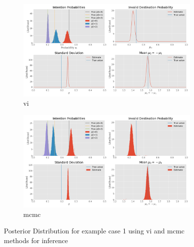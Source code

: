 \begin{figure}[h]
    \centering
    \begin{subfigure}{\textwidth}
    \includegraphics[width=\textwidth]{figures/example_1b_vi_posterior.png}
    \caption{\acrshort{vi}}
    \end{subfigure}
    \begin{subfigure}{\textwidth}
    \includegraphics[width=\textwidth]{figures/example_1b_mcmc_posterior.png}
    \caption{\acrshort{mcmc}}
    \end{subfigure}
    \caption{Posterior Distribution for example case 1 using \acrshort{vi} and \acrshort{mcmc} methods for inference}
    \label{fig:example_case_1}
\end{figure}

